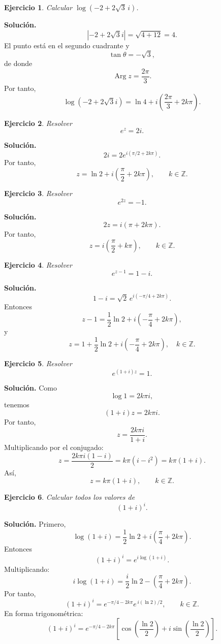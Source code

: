 \documentclass[12pt]{article}
\DeclareMathOperator{\Arg}{Arg}
\newtheorem{ejercicio}{Ejercicio}[section]
\begin{document}
\begin{ejercicio}
Calcular $\log(-2+2\sqrt3\,i)$.
\end{ejercicio}

\textbf{Solución.}
\[
|-2+2\sqrt3 i|
=\sqrt{4+12}=4.
\]
El punto está en el segundo cuadrante y
\[
\tan\theta=-\sqrt3,
\]
de donde
\[
\Arg z=\frac{2\pi}{3}.
\]
Por tanto,
\[
\boxed{
\log(-2+2\sqrt3 i)
=
\ln4+i\left(\frac{2\pi}{3}+2k\pi\right).
}
\]

\begin{ejercicio}
Resolver
\[
e^z=2i.
\]
\end{ejercicio}

\textbf{Solución.}
\[
2i=2e^{i(\pi/2+2k\pi)}.
\]
Por tanto,
\[
\boxed{
z=\ln2+i\left(\frac{\pi}{2}+2k\pi\right),
\qquad k\in\mathbb Z.
}
\]

\begin{ejercicio}
Resolver
\[
e^{2z}=-1.
\]
\end{ejercicio}

\textbf{Solución.}
\[
2z=i(\pi+2k\pi).
\]
Por tanto,
\[
\boxed{
z=i\left(\frac{\pi}{2}+k\pi\right),
\qquad k\in\mathbb Z.
}
\]

\begin{ejercicio}
Resolver
\[
e^{z-1}=1-i.
\]
\end{ejercicio}

\textbf{Solución.}
\[
1-i=\sqrt2\,e^{i(-\pi/4+2k\pi)}.
\]
Entonces
\[
z-1
=
\frac12\ln2
+i\left(-\frac{\pi}{4}+2k\pi\right),
\]
y
\[
\boxed{
z=
1+\frac12\ln2
+i\left(-\frac{\pi}{4}+2k\pi\right),
\quad k\in\mathbb Z.
}
\]

\begin{ejercicio}
Resolver
\[
e^{(1+i)z}=1.
\]
\end{ejercicio}

\textbf{Solución.}
Como
\[
\log1=2k\pi i,
\]
tenemos
\[
(1+i)z=2k\pi i.
\]
Por tanto,
\[
z=\frac{2k\pi i}{1+i}.
\]
Multiplicando por el conjugado:
\[
z=
\frac{2k\pi i(1-i)}{2}
=k\pi(i-i^2)
=k\pi(1+i).
\]
Así,
\[
\boxed{
z=k\pi(1+i),\qquad k\in\mathbb Z.
}
\]

\begin{ejercicio}
Calcular todos los valores de
\[
(1+i)^i.
\]
\end{ejercicio}

\textbf{Solución.}
Primero,
\[
\log(1+i)
=
\frac12\ln2
+i\left(\frac{\pi}{4}+2k\pi\right).
\]
Entonces
\[
(1+i)^i=e^{i\log(1+i)}.
\]
Multiplicando:
\[
i\log(1+i)
=
\frac{i}{2}\ln2
-\left(\frac{\pi}{4}+2k\pi\right).
\]
Por tanto,
\[
\boxed{
(1+i)^i
=
e^{-\pi/4-2k\pi}
e^{\,i(\ln2)/2},
\qquad k\in\mathbb Z.
}
\]
En forma trigonométrica:
\[
\boxed{
(1+i)^i
=
e^{-\pi/4-2k\pi}
\left[
\cos\left(\frac{\ln2}{2}\right)
+i\sin\left(\frac{\ln2}{2}\right)
\right].
}
\]
\end{document}

